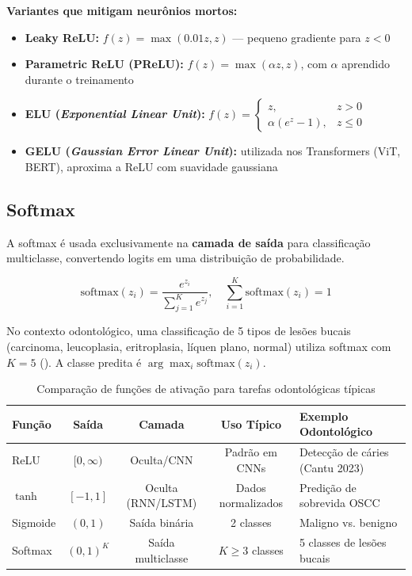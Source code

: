 \textbf{Variantes que mitigam neurônios mortos:}
\begin{itemize}
  \item \textbf{Leaky ReLU:} $f(z) = \max(0.01z, z)$ --- pequeno gradiente para $z < 0$
  \item \textbf{Parametric ReLU (PReLU):} $f(z) = \max(\alpha z, z)$, com $\alpha$
        aprendido durante o treinamento
  \item \textbf{ELU (\textit{Exponential Linear Unit}):}
        $f(z) = \begin{cases} z, & z > 0 \\ \alpha(e^z - 1), & z \leq 0 \end{cases}$
  \item \textbf{GELU (\textit{Gaussian Error Linear Unit}):} utilizada nos
        Transformers (ViT, BERT), aproxima a ReLU com suavidade gaussiana
\end{itemize}

\subsection{Softmax}

A softmax é usada exclusivamente na \textbf{camada de saída} para classificação
multiclasse, convertendo logits em uma distribuição de probabilidade.

\begin{equation}
  \text{softmax}(z_i) = \frac{e^{z_i}}{\sum_{j=1}^{K} e^{z_j}}, \quad
  \sum_{i=1}^{K} \text{softmax}(z_i) = 1
  \label{eq:softmax}
\end{equation}

No contexto odontológico, uma classificação de 5 tipos de lesões bucais (carcinoma,
leucoplasia, eritroplasia, líquen plano, normal) utiliza softmax com $K=5$
(). A classe predita é $\arg\max_i \text{softmax}(z_i)$.

\begin{table}[H]
  \centering
  \caption{Comparação de funções de ativação para tarefas odontológicas típicas}
  \label{tab:ativacao-odonto}
  \begin{tabularx}{\textwidth}{lcccX}
    \toprule
    \textbf{Função} & \textbf{Saída} & \textbf{Camada} & \textbf{Uso Típico} & \textbf{Exemplo Odontológico} \\
    \midrule
    ReLU & $[0, \infty)$ & Oculta/CNN & Padrão em CNNs & Detecção de cáries (Cantu 2023) \\
    $\tanh$ & $[-1, 1]$ & Oculta (RNN/LSTM) & Dados normalizados & Predição de sobrevida OSCC \\
    Sigmoide & $(0, 1)$ & Saída binária & 2 classes & Maligno vs. benigno \\
    Softmax & $(0,1)^K$ & Saída multiclasse & $K \geq 3$ classes & 5 classes de lesões bucais \\
    \bottomrule
  \end{tabularx}
\end{table}

